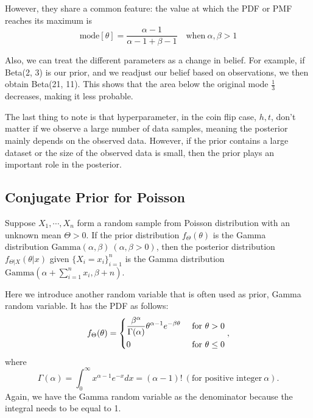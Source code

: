 However, they share a common feature: the value at which the PDF or PMF reaches its maximum is 
\[
  \text{mode}[\theta] = \dfrac{\alpha - 1}{\alpha - 1 + \beta - 1} \quad \text{when}\ \alpha, \beta > 1
\] 

Also, we can treat the different parameters as a change in belief. For example, if Beta(2, 3) is our prior, and we readjust our belief based on observations, we then obtain Beta(21, 11). This shows that the area below the original mode \(\frac{1}{3}\) decreases, making it less probable. 

The last thing to note is that hyperparameter, in the coin flip case, \(h, t\), don’t matter if we observe a large number of data samples, meaning the posterior mainly depends on the observed data. However, if the prior contains a large dataset or the size of the observed data is small, then the prior plays an important role in the posterior. 

\subsection{Conjugate Prior for Poisson}
\begin{definition}
  Suppose \(X_1, \cdots, X_n\) form a random sample from Poisson distribution with an unknown mean \(\Theta > 0\). If the prior distribution \(f_{\Theta}(\theta)\) is the Gamma distribution \(\text{Gamma}(\alpha, \beta)\ (\alpha, \beta >0)\), then the posterior distribution \(f_{\Theta \vert X} (\theta \vert x)\) given \(\{X_i = x_i\}_{i=1} ^n\) is the Gamma distribution \(\text{Gamma}(\alpha + \sum_{i = 1}^n x_i, \beta + n)\). 
\end{definition}

Here we introduce another random variable that is often used as prior, Gamma random variable. It has the PDF as follows: 
\[
  f_{\Theta} (\theta) = \begin{dcases}
    \dfrac{\beta^{\alpha}}{\Gamma (\alpha)}\theta^{\alpha - 1} e^{-\beta\theta} &\text{ for } \theta > 0 \\
    0 &\text{ for } \theta \leq 0 \\
  \end{dcases}, 
\]
where 
\[
  \Gamma (\alpha) = \int_{0}^{\infty} x^{\alpha - 1} e^{-x} dx = (\alpha - 1)!\ (\text{for positive integer}\ \alpha).
\]
Again, we have the Gamma random variable as the denominator because the integral needs to be equal to 1.

